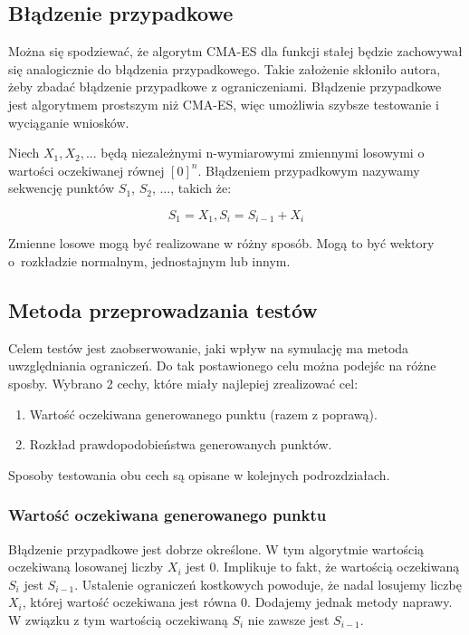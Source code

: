 \documentclass{mini}
\begin{document}
\subsection{Błądzenie przypadkowe} \label{bladzenie}

Można się spodziewać, że algorytm CMA-ES dla funkcji stałej będzie zachowywał się analogicznie do błądzenia przypadkowego. Takie założenie skłoniło autora, żeby zbadać błądzenie przypadkowe z ograniczeniami. Błądzenie przypadkowe jest algorytmem prostszym niż CMA-ES, więc umożliwia szybsze testowanie i wyciąganie wniosków.

Niech $ X_1, X_2, ... $ będą niezależnymi n-wymiarowymi zmiennymi losowymi o wartości oczekiwanej równej $ [0]^n $. Błądzeniem przypadkowym nazywamy sekwencję punktów $S_1$, $S_2$, ..., takich że:

\begin{equation}
S_1 = X_1, S_i=S_{i-1}+X_i
\end{equation}

Zmienne losowe mogą być realizowane w różny sposób. Mogą to być wektory o~rozkładzie normalnym, jednostajnym lub innym.

\subsection{Metoda przeprowadzania testów}
Celem testów jest zaobserwowanie, jaki wpływ na symulację ma metoda uwzględniania ograniczeń. Do tak postawionego celu można podejśc na różne sposby. Wybrano 2 cechy, które miały najlepiej zrealizować cel:
\begin{enumerate}
\item Wartość oczekiwana generowanego punktu (razem z poprawą).
\item Rozkład prawdopodobieństwa generowanych punktów.
\end{enumerate}

Sposoby testowania obu cech są opisane w kolejnych podrozdziałach.

\subsubsection{Wartość oczekiwana generowanego punktu}
Błądzenie przypadkowe jest dobrze określone. W tym algorytmie wartością oczekiwaną losowanej liczby $X_i$ jest 0. Implikuje to fakt, że wartością oczekiwaną $S_i$ jest $S_{i-1}$. Ustalenie ograniczeń kostkowych powoduje, że nadal losujemy liczbę $X_i$, której wartość oczekiwana jest równa 0. Dodajemy jednak metody naprawy. W związku z tym wartością oczekiwaną $S_i$ nie zawsze jest $S_{i-1}$.
\end{document}
